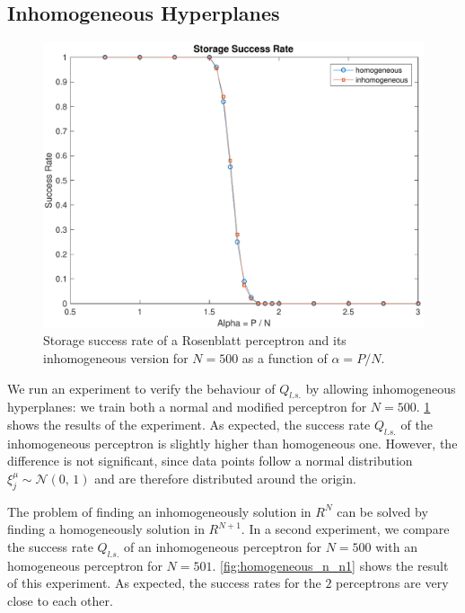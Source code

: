 \subsection{Inhomogeneous Hyperplanes}
\label{subsec:homogeneous}
\begin{figure}[t]
	\centering
	\includegraphics[width=\columnwidth]{figures/homogeneous}
    \caption{Storage success rate of a Rosenblatt perceptron and its inhomogeneous version for $N = 500$ as a function of $\alpha = P / N$.}
	\label{fig:homogeneous}
\end{figure}
We run an experiment to verify the behaviour of $Q_{l.s.}$ by allowing inhomogeneous hyperplanes:
we train both a normal and modified perceptron for $N = 500$.
\cref{fig:homogeneous} shows the results of the experiment.
As expected, the success rate $Q_{l.s.}$ of the inhomogeneous perceptron is slightly higher than homogeneous one.
However, the difference is not significant, since data points follow a normal distribution $\xi^\mu_j \sim \mathcal{N}(0,\,1)$ and are therefore distributed around the origin.

The problem of finding an inhomogeneously solution in $R^{N}$ can be solved by finding a homogeneously solution in $R^{N + 1}$.
In a second experiment, we compare the success rate $Q_{l.s.}$ of an inhomogeneous perceptron for $N = 500$ with an homogeneous perceptron for $N = 501$.
\cref{fig:homogeneous_n_n1} shows the result of this experiment.
As expected, the success rates for the $2$ perceptrons are very close to each other.

